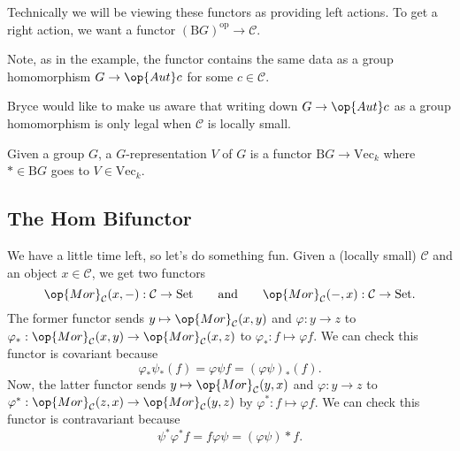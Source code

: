 \begin{remark}
	Technically we will be viewing these functors as providing left actions. To get a right action, we want a functor $(\mathrm BG)^\mathrm{op}\to\mathcal C$.
\end{remark}
Note, as in the example, the functor contains the same data as a group homomorphism $G\to\op{Aut}c$ for some $c\in\mathcal C$.
\begin{remark}
	Bryce would like to make us aware that writing down $G\to\op{Aut}c$ as a group homomorphism is only legal when $\mathcal C$ is locally small.
\end{remark}
\begin{example}
	Given a group $G$, a $G$-representation $V$ of $G$ is a functor $\mathrm BG\to\mathrm{Vec}_k$ where $*\in\mathrm BG$ goes to $V\in\mathrm{Vec}_k$.
\end{example}

\subsection{The \textrm{Hom} Bifunctor}
We have a little time left, so let's do something fun. Given a (locally small) $\mathcal C$ and an object $x\in\mathcal C$, we get two functors
\[\op{Mor}_\mathcal C(x,-):\mathcal C\to\mathrm{Set}\qquad\text{and}\qquad\op{Mor}_\mathcal C(-,x):\mathcal C\to\mathrm{Set}.\]
The former functor sends $y\mapsto\op{Mor}_\mathcal C(x,y)$ and $\varphi:y\to z$ to $\varphi_*:\op{Mor}_\mathcal C(x,y)\to\op{Mor}_\mathcal C(x,z)$ to $\varphi_*:f\mapsto\varphi f$. We can check this functor is covariant because
\[\varphi_*\psi_*(f)=\varphi\psi f=(\varphi\psi)_*(f).\]
Now, the latter functor sends $y\mapsto\op{Mor}_\mathcal C(y,x)$ and $\varphi:y\to z$ to $\varphi^*:\op{Mor}_\mathcal C(z,x)\to\op{Mor}_\mathcal C(y,z)$ by $\varphi^*:f\mapsto\varphi f$. We can check this functor is contravariant because
\[\psi^*\varphi^*f=f\varphi\psi=(\varphi\psi)*f.\]